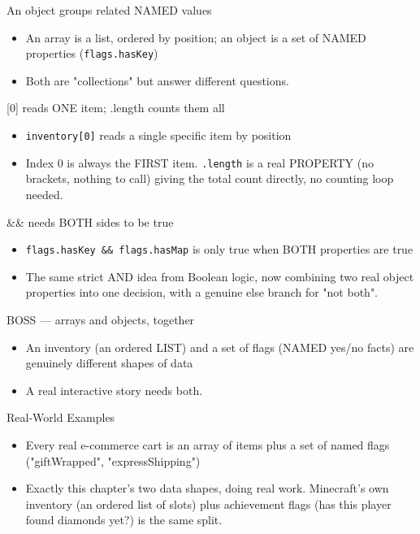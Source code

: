 \documentclass[aspectratio=169]{beamer}
\begin{document}
\begin{frame}{An object groups related NAMED values}
    \large
    \begin{itemize}
        \item An array is a list, ordered by position; an object is a set of NAMED properties (\texttt{flags.hasKey})
        \item Both are "collections" but answer different questions.
    \end{itemize}
\end{frame}


\begin{frame}{[0] reads ONE item; .length counts them all}
    \large
    \begin{itemize}
        \item \texttt{inventory[0]} reads a single specific item by position
        \item Index 0 is always the FIRST item. \texttt{.length} is a real PROPERTY (no brackets, nothing to call) giving the total count directly, no counting loop needed.
    \end{itemize}
\end{frame}


\begin{frame}{\&\& needs BOTH sides to be true}
    \large
    \begin{itemize}
        \item \texttt{flags.hasKey \&\& flags.hasMap} is only true when BOTH properties are true
        \item The same strict AND idea from Boolean logic, now combining two real object properties into one decision, with a genuine else branch for "not both".
    \end{itemize}
\end{frame}


\begin{frame}{BOSS — arrays and objects, together}
    \large
    \begin{itemize}
        \item An inventory (an ordered LIST) and a set of flags (NAMED yes/no facts) are genuinely different shapes of data
        \item A real interactive story needs both.
    \end{itemize}
\end{frame}

\begin{frame}{Real-World Examples}
    \large
    \begin{itemize}
        \item Every real e-commerce cart is an array of items plus a set of named flags ("giftWrapped", "expressShipping")
        \item Exactly this chapter's two data shapes, doing real work. Minecraft's own inventory (an ordered list of slots) plus achievement flags (has this player found diamonds yet?) is the same split.
    \end{itemize}
\end{frame}
\end{document}
